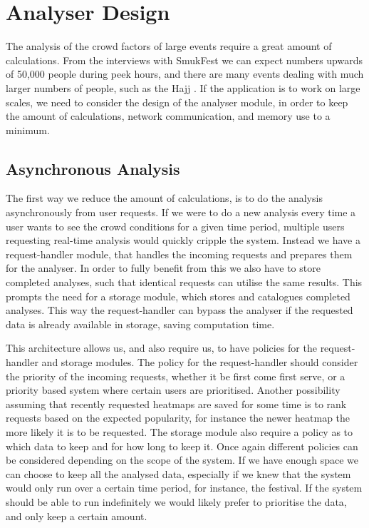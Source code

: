\section{Analyser Design}\label{s3:analyser_design}

The analysis of the crowd factors of large events require a great amount of calculations. From the interviews with SmukFest we can expect numbers upwards of 50,000 people during peek hours, and there are many events dealing with much larger numbers of people, such as the Hajj \cite{website:Wikipedia-Hajj2}. If the application is to work on large scales, we need to consider the design of the analyser module, in order to keep the amount of calculations, network communication, and memory use to a minimum.

\subsection{Asynchronous Analysis}
\label{sub:Asynchronous_Analysis}

The first way we reduce the amount of calculations, is to do the analysis asynchronously from user requests. If we were to do a new analysis every time a user wants to see the crowd conditions for a given time period, multiple users requesting real-time analysis would quickly cripple the system. Instead we have a request-handler module, that handles the incoming requests and prepares them for the analyser. In order to fully benefit from this we also have to store completed analyses, such that identical requests can utilise the same results. This prompts the need for a storage module, which stores and catalogues completed analyses. This way the request-handler can bypass the analyser if the requested data is already available in storage, saving computation time.

This architecture allows us, and also require us, to have policies for the request-handler and storage modules. The policy for the request-handler should consider the priority of the incoming requests, whether it be first come first serve, or a priority based system where certain users are prioritised. Another possibility assuming that recently requested heatmaps are saved for some time is to rank requests based on the expected popularity, for instance the newer heatmap the more likely it is to be requested. The storage module also require a policy as to which data to keep and for how long to keep it. Once again different policies can be considered depending on the scope of the system. If we have enough space we can choose to keep all the analysed data, especially if we knew that the system would only run over a certain time period, for instance, the festival. If the system should be able to run indefinitely we would likely prefer to prioritise the data, and only keep a certain amount.

